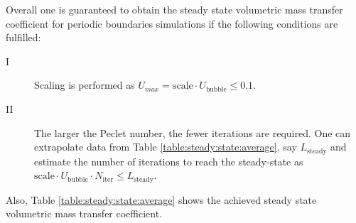 \documentclass{article}
\newcommand{\ububble}{U_{\mathrm{bubble}}}
\begin{document}
Overall one is guaranteed to obtain the steady state volumetric mass transfer coefficient for
periodic boundaries simulations if the following conditions are fulfilled:
\begin{description}
\item[I] Scaling is performed as $U_{max}=\mathrm{scale}\cdot\ububble\leq 0.1$.
\item[II] The larger the Peclet number, the fewer iterations are required. One can extrapolate data from Table
\ref{table:steady:state:average}, say $L_{\mathrm{steady}}$ and estimate the  number of
iterations to reach the steady-state as $\mathrm{scale}\cdot \ububble\cdot N_{\mathrm{iter}}\leq L_{\mathrm{steady}}$. 
\end{description}
Also, Table \ref{table:steady:state:average} shows
the achieved steady state volumetric mass transfer coefficient. 
\end{document}
